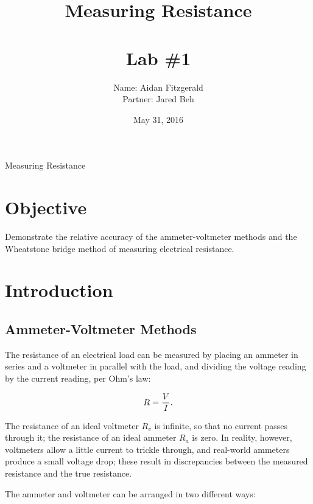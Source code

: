\documentclass[11pt, titlepage, letterpaper, twoside]{article}
\title{\textbf{Measuring Resistance} \\ \ \\ \large Lab \#1 }
\author{Name: Aidan Fitzgerald \\ Partner: Jared Beh}
\date{May 31, 2016}
\begin{document}
\maketitle

\begin{center}
\LARGE Measuring Resistance
\end{center}

\section*{Objective}
Demonstrate the relative accuracy of the ammeter-voltmeter methods and the Wheatstone bridge method of measuring electrical resistance.

\section{Introduction}

\subsection{Ammeter-Voltmeter Methods}

The resistance of an electrical load can be measured by placing an ammeter in series and a voltmeter in parallel with the load, and dividing the voltage
reading by the current reading, per Ohm's law:

\begin{equation}
R = \frac{V}{I\/}.
\end{equation}

The resistance of an ideal voltmeter $R_v$ is infinite, so that no current passes through it; the resistance of an ideal ammeter $R_a$ is zero. In reality,
however, voltmeters allow a little current to trickle through, and real-world ammeters produce a small voltage drop; these result in discrepancies between
the measured resistance and the true resistance.

The ammeter and voltmeter can be arranged in two different ways:
\end{document}
